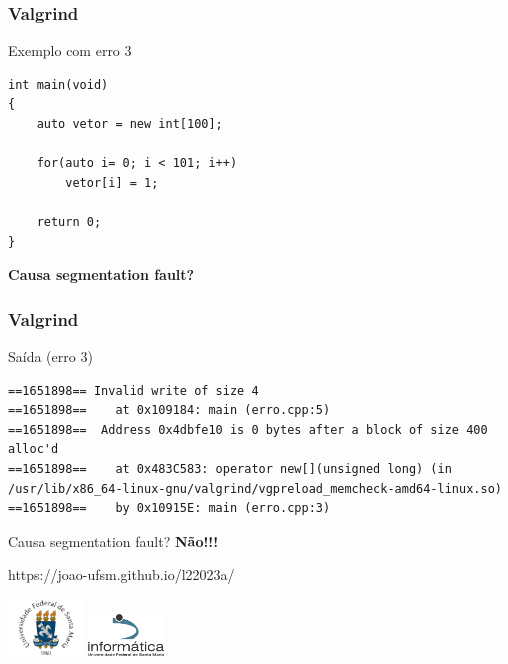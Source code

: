 \documentclass[xcolor={usenames,dvipsnames},12pt,presentation,aspectratio=169]{beamer}
\begin{document}
\begin{frame}[fragile]
  \frametitle{Valgrind}
  \begin{block}{Exemplo com erro 3}
\begin{lstlisting}
int main(void)
{
    auto vetor = new int[100];

    for(auto i= 0; i < 101; i++)
        vetor[i] = 1;
    
    return 0;
}
\end{lstlisting}
\end{block}
  \alert{\large \textbf{Causa segmentation fault?}}
\end{frame}
\begin{frame}[fragile]
  \frametitle{Valgrind}
  \begin{block}{Saída (erro 3)}
\begin{lstlisting}
==1651898== Invalid write of size 4
==1651898==    at 0x109184: main (erro.cpp:5)
==1651898==  Address 0x4dbfe10 is 0 bytes after a block of size 400 alloc'd
==1651898==    at 0x483C583: operator new[](unsigned long) (in /usr/lib/x86_64-linux-gnu/valgrind/vgpreload_memcheck-amd64-linux.so)
==1651898==    by 0x10915E: main (erro.cpp:3)
\end{lstlisting}
\end{block}
  \alert{\large Causa segmentation fault? \textbf{Não!!!}}
\end{frame}
\begin{frame}[plain]{}
  \begin{center}
    \vspace{2cm}
    \Large{https://joao-ufsm.github.io/l22023a/}
    
    \vspace{1cm}
    \includegraphics[width=2cm]{logo_ufsm}
    \hspace{0.5cm}
    \includegraphics[width=2cm]{logo_inf}
  \end{center}
\end{frame}
\end{document}
